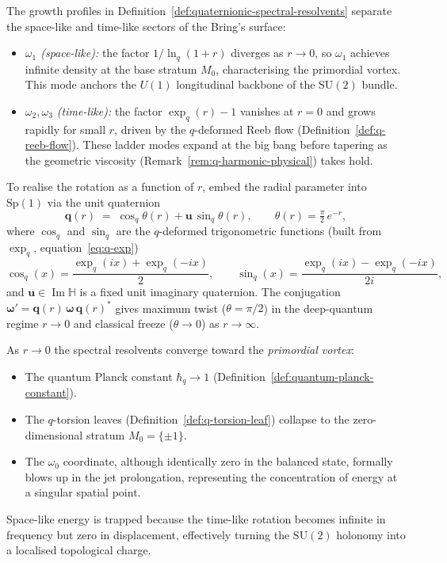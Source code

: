 \begin{remark}
\label{rem:spectral-dynamics}
The growth profiles in
Definition~\ref{def:quaternionic-spectral-resolvents} separate the space-like
and time-like sectors of the Bring's surface:
\begin{itemize}
\item \emph{$\omega_1$ (space-like):}\; the factor $1/\ln_q(1+r)$ diverges
  as $r\to 0$, so $\omega_1$ achieves infinite density at the base stratum
  $M_0$, characterising the primordial vortex.  This mode anchors the
  $U(1)$ longitudinal backbone of the $\mathrm{SU}(2)$ bundle.
\item \emph{$\omega_2,\omega_3$ (time-like):}\; the factor
  $\exp_q(r)-1$ vanishes at $r=0$ and grows rapidly for small $r$,
  driven by the $q$-deformed Reeb flow
  (Definition~\ref{def:q-reeb-flow}).  These ladder modes expand at the big
  bang before tapering as the geometric viscosity
  (Remark~\ref{rem:q-harmonic-physical}) takes hold.
\end{itemize}
To realise the rotation as a function of $r$, embed the radial parameter
into $\mathrm{Sp}(1)$ via the unit quaternion
\begin{equation}\label{eq:sp1-quaternion}
  \mathbf{q}(r)
  \;=\;
  \cos_q\!\theta(r)+\mathbf{u}\,\sin_q\!\theta(r),
  \qquad
  \theta(r)=\tfrac{\pi}{2}\,e^{-r},
\end{equation}
where $\cos_q$ and $\sin_q$ are the $q$-deformed trigonometric functions
(built from $\exp_q$, equation~\eqref{eq:q-exp})
\[
  \cos_q(x)=\frac{\exp_q(ix)+\exp_q(-ix)}{2},
  \qquad
  \sin_q(x)=\frac{\exp_q(ix)-\exp_q(-ix)}{2i},
\]
and $\mathbf{u}\in\operatorname{Im}\mathbb{H}$ is a fixed unit imaginary
quaternion.  The conjugation
$\boldsymbol{\omega}'=\mathbf{q}(r)\,\boldsymbol{\omega}\,\mathbf{q}(r)^{*}$
gives maximum twist ($\theta=\pi/2$) in the deep-quantum regime $r\to 0$
and classical freeze ($\theta\to 0$) as $r\to\infty$.
\end{remark}

\begin{remark}
\label{rem:primordial-vortex}
As $r\to 0$ the spectral resolvents converge toward the
\emph{primordial vortex}:
\begin{itemize}
\item The quantum Planck constant
  $\hbar_q\to 1$ (Definition~\ref{def:quantum-planck-constant}).
\item The $q$-torsion leaves
  (Definition~\ref{def:q-torsion-leaf}) collapse to the zero-dimensional
  stratum $M_0=\{\pm 1\}$.
\item The $\omega_0$ coordinate, although identically zero in the
  balanced state, formally blows up in the jet prolongation, representing
  the concentration of energy at a singular spatial point.
\end{itemize}
Space-like energy is trapped because the time-like rotation becomes infinite
in frequency but zero in displacement, effectively turning the
$\mathrm{SU}(2)$ holonomy into a localised topological charge.
\end{remark}

